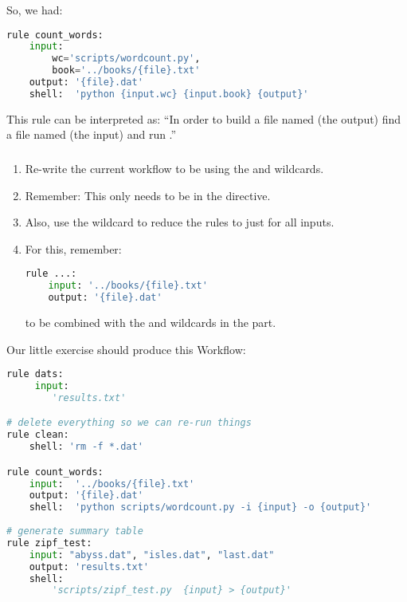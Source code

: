 \begin{frame}[fragile]
  So, we had:
    \begin{lstlisting}[language=Python,style=Python]
  rule count_words:
    input:
        wc='scripts/wordcount.py',
        book='../books/{file}.txt'
    output: '{file}.dat'
    shell:  'python {input.wc} {input.book} {output}'   
    \end{lstlisting}
    \begin{block}{This rule can be interpreted as:}
``In order to build a file named  (the output) find a file named  (the input) and run .''
  \end{block}
\end{frame}

\begin{frame}[fragile]
  \frametitle{}
  \begin{enumerate}
   \item Re-write the current workflow to be using the  and  wildcards.
   \item Remember: This only needs to be in the  directive.
   \item Also, use the  wildcard to reduce the  rules to just  for all inputs.
   \item For this, remember:
         \begin{lstlisting}[language=Python,style=Python]
rule ...:
    input: '../books/{file}.txt'
    output: '{file}.dat'
         \end{lstlisting}
         to be combined with the  and  wildcards in the  part.
  \end{enumerate}
\end{frame}


\begin{frame}[fragile]
Our little exercise should produce this Workflow:
      \begin{lstlisting}[language=Python,style=Python, basicstyle=\tiny]
rule dats:
     input:
        'results.txt'

# delete everything so we can re-run things
rule clean:
    shell: 'rm -f *.dat'

rule count_words:
    input:  '../books/{file}.txt'
    output: '{file}.dat'
    shell:  'python scripts/wordcount.py -i {input} -o {output}'
    
# generate summary table
rule zipf_test:
    input: "abyss.dat", "isles.dat", "last.dat"
    output: 'results.txt'
    shell:  
        'scripts/zipf_test.py  {input} > {output}'
      \end{lstlisting}

\end{frame}
